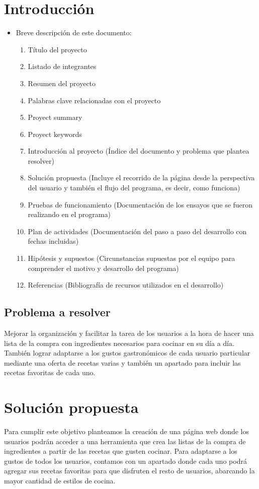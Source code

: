 \documentclass[a4paper,11pt]{article}
\begin{document}
\section*{Introducción}
\begin{itemize}
    \item Breve descripción de este documento:
    \begin{enumerate}
        \item Título del proyecto
        \item Listado de integrantes
        \item Resumen del proyecto
        \item Palabras clave relacionadas con el proyecto
        \item Proyect summary
        \item Proyect keywords
        \item Introducción al proyecto (Índice del documento y problema que plantea resolver)
        \item Solución propuesta (Incluye el recorrido de la página desde la perspectiva del usuario y también el flujo del programa, es decir, como funciona)
        \item Pruebas de funcionamiento (Documentación de los ensayos que se fueron realizando en el programa)
        \item Plan de actividades (Documentación del paso a paso del desarrollo con fechas incluidas)
        \item Hipótesis y supuestos (Circunstancias supuestas por el equipo para comprender el motivo y desarrollo del programa)
        \item Referencias (Bibliografía de recursos utilizados en el desarrollo)
    \end{enumerate}
\end{itemize}

\subsection*{Problema a resolver}
Mejorar la organización y facilitar la tarea de los usuarios a la hora de hacer una lista de la compra con ingredientes necesarios para cocinar en su día a día. También lograr adaptarse a los gustos gastronómicos de cada usuario particular mediante una oferta de recetas varias y también un apartado para incluir las recetas favoritas de cada uno.

\section*{Solución propuesta}
Para cumplir este objetivo planteamos la creación de una página web donde los usuarios podrán acceder a una herramienta que crea las listas de la compra de ingredientes a partir de las recetas que gusten cocinar. Para adaptarse a los gustos de todos los usuarios, contamos con un apartado donde cada uno podrá agregar sus recetas favoritas para que disfruten el resto de usuarios, abarcando la mayor cantidad de estilos de cocina.
\end{document}
